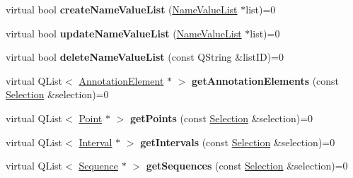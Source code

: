 \begin{DoxyCompactItemize}
\item 
\mbox{\label{class_annotation_datastore_a9adc754e4071980dc0e7026a6b7ed3f0}} 
virtual bool {\bfseries create\+Name\+Value\+List} (\hyperlink{class_name_value_list}{Name\+Value\+List} $\ast$list)=0
\item 
\mbox{\label{class_annotation_datastore_ae06470eb992d4b88a7898a14db157e6e}} 
virtual bool {\bfseries update\+Name\+Value\+List} (\hyperlink{class_name_value_list}{Name\+Value\+List} $\ast$list)=0
\item 
\mbox{\label{class_annotation_datastore_a1cfb746ba61a9c126babd3d7dc903d07}} 
virtual bool {\bfseries delete\+Name\+Value\+List} (const Q\+String \&list\+ID)=0
\item 
\mbox{\label{class_annotation_datastore_ada50673875961000666ed8dcf4ea410b}} 
virtual Q\+List$<$ \hyperlink{class_annotation_element}{Annotation\+Element} $\ast$ $>$ {\bfseries get\+Annotation\+Elements} (const \hyperlink{class_annotation_datastore_1_1_selection}{Selection} \&selection)=0
\item 
\mbox{\label{class_annotation_datastore_afc48fd23fbd5e76832337d18d498ec23}} 
virtual Q\+List$<$ \hyperlink{class_point}{Point} $\ast$ $>$ {\bfseries get\+Points} (const \hyperlink{class_annotation_datastore_1_1_selection}{Selection} \&selection)=0
\item 
\mbox{\label{class_annotation_datastore_ad9d97f1d7b469bb6a3778db559b8156a}} 
virtual Q\+List$<$ \hyperlink{class_interval}{Interval} $\ast$ $>$ {\bfseries get\+Intervals} (const \hyperlink{class_annotation_datastore_1_1_selection}{Selection} \&selection)=0
\item 
\mbox{\label{class_annotation_datastore_a1021093e3313b9444b51470e96bb14ad}} 
virtual Q\+List$<$ \hyperlink{class_sequence}{Sequence} $\ast$ $>$ {\bfseries get\+Sequences} (const \hyperlink{class_annotation_datastore_1_1_selection}{Selection} \&selection)=0
\item 
\mbox{\label{class_annotation_datastore_a61c96280f3fe6d8adc9024fb6a09a848}} 

\end{DoxyCompactItemize}

